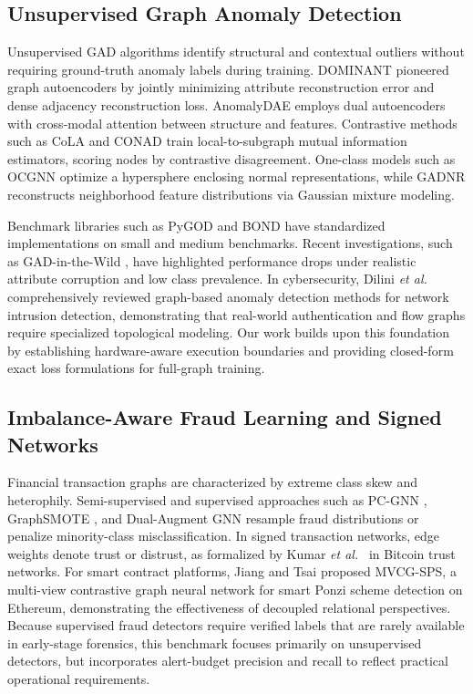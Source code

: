 \documentclass[applsci,article,submit,moreauthors,pdftex]{Definitions/mdpi}
\newcommand{\etal}{\emph{et al.}}
\begin{document}
\subsection{Unsupervised Graph Anomaly Detection}
Unsupervised GAD algorithms identify structural and contextual outliers without requiring ground-truth anomaly labels during training. DOMINANT \cite{ding2019deep} pioneered graph autoencoders by jointly minimizing attribute reconstruction error and dense adjacency reconstruction loss. AnomalyDAE \cite{fan2020anomalydae} employs dual autoencoders with cross-modal attention between structure and features. Contrastive methods such as CoLA \cite{liu2022cola} and CONAD \cite{xu2022conad} train local-to-subgraph mutual information estimators, scoring nodes by contrastive disagreement. One-class models such as OCGNN \cite{wang2021ocgnn} optimize a hypersphere enclosing normal representations, while GADNR \cite{roy2024gadnr} reconstructs neighborhood feature distributions via Gaussian mixture modeling. 

Benchmark libraries such as PyGOD \cite{liu2024pygod} and BOND \cite{liu2022bond} have standardized implementations on small and medium benchmarks. Recent investigations, such as GAD-in-the-Wild \cite{zhou2026wild}, have highlighted performance drops under realistic attribute corruption and low class prevalence. In cybersecurity, Dilini \etal\ \cite{dilini2026comprehensive} comprehensively reviewed graph-based anomaly detection methods for network intrusion detection, demonstrating that real-world authentication and flow graphs require specialized topological modeling. Our work builds upon this foundation by establishing hardware-aware execution boundaries and providing closed-form exact loss formulations for full-graph training.

\subsection{Imbalance-Aware Fraud Learning and Signed Networks}
Financial transaction graphs are characterized by extreme class skew and heterophily. Semi-supervised and supervised approaches such as PC-GNN \cite{liu2021pcgnn}, GraphSMOTE \cite{zhao2021graphsmote}, and Dual-Augment GNN \cite{li2022dualaugment} resample fraud distributions or penalize minority-class misclassification. In signed transaction networks, edge weights denote trust or distrust, as formalized by Kumar \etal\ \cite{kumar2016edge} in Bitcoin trust networks. For smart contract platforms, Jiang and Tsai \cite{jiang2025mvcg} proposed MVCG-SPS, a multi-view contrastive graph neural network for smart Ponzi scheme detection on Ethereum, demonstrating the effectiveness of decoupled relational perspectives. Because supervised fraud detectors require verified labels that are rarely available in early-stage forensics, this benchmark focuses primarily on unsupervised detectors, but incorporates alert-budget precision and recall to reflect practical operational requirements.
\end{document}
